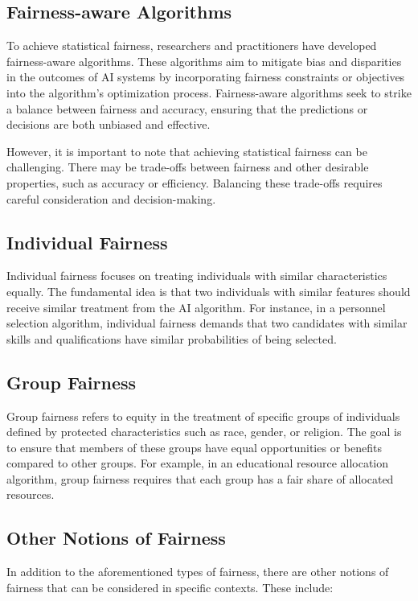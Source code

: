 \documentclass[12pt,a4paper,openright,twoside]{book}
\begin{document}
\subsection{Fairness-aware Algorithms}

To achieve statistical fairness, researchers and practitioners have developed fairness-aware algorithms. These algorithms aim to mitigate bias and disparities in the outcomes of AI systems by incorporating fairness constraints or objectives into the algorithm's optimization process. Fairness-aware algorithms seek to strike a balance between fairness and accuracy, ensuring that the predictions or decisions are both unbiased and effective.

However, it is important to note that achieving statistical fairness can be challenging. There may be trade-offs between fairness and other desirable properties, such as accuracy or efficiency. Balancing these trade-offs requires careful consideration and decision-making.

\subsection{Individual Fairness}
Individual fairness focuses on treating individuals with similar characteristics equally. The fundamental idea is that two individuals with similar features should receive similar treatment from the AI algorithm. For instance, in a personnel selection algorithm, individual fairness demands that two candidates with similar skills and qualifications have similar probabilities of being selected.

\subsection{Group Fairness}
Group fairness refers to equity in the treatment of specific groups of individuals defined by protected characteristics such as race, gender, or religion. The goal is to ensure that members of these groups have equal opportunities or benefits compared to other groups. For example, in an educational resource allocation algorithm, group fairness requires that each group has a fair share of allocated resources.

\subsection{Other Notions of Fairness}
In addition to the aforementioned types of fairness, there are other notions of fairness that can be considered in specific contexts. These include:
\end{document}
